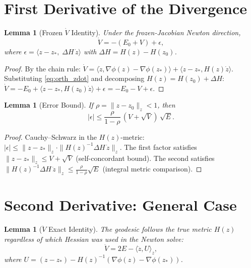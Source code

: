\documentclass[11pt]{article}
\newtheorem{lemma}[theorem]{Lemma}
\begin{document}
\section{First Derivative of the Divergence}

\begin{lemma}[Frozen $\dot{V}$ Identity]
\label{lem:vdot_frozen}
Under the frozen-Jacobian Newton direction,
\begin{equation} \label{eq:vdot_frozen}
    \dot{V} = -(E_0 + V) + \epsilon,
\end{equation}
where $\epsilon = \langle z - z_*,\; \Delta H\, \dot{z} \rangle$
with $\Delta H = H(z) - H(z_0)$.
\end{lemma}

\begin{proof}
By the chain rule:
$\dot{V} = \langle \dot{z}, \nabla\phi(z) - \nabla\phi(z_*) \rangle
         + \langle z - z_*, H(z)\dot{z} \rangle$.
Substituting \eqref{eq:orth_zdot} and decomposing $H(z) = H(z_0) + \Delta H$:
$\dot{V} = -E_0 + \langle z-z_*, H(z_0)\dot{z}\rangle + \epsilon
         = -E_0 - V + \epsilon$.
\end{proof}

\begin{lemma}[Error Bound]
\label{lem:epsilon_bound}
If $\rho = \|z - z_0\|_z < 1$, then
\begin{equation}
    |\epsilon| \le \frac{\rho}{1-\rho}\,(V + \sqrt{V})\,\sqrt{E}.
\end{equation}
\end{lemma}

\begin{proof}
Cauchy--Schwarz in the $H(z)$-metric:
$|\epsilon| \le \|z-z_*\|_z \cdot \|H(z)^{-1}\Delta H\,\dot{z}\|_z$.
The first factor satisfies $\|z-z_*\|_z \le V + \sqrt{V}$
(self-concordant bound).  The second satisfies
$\|H(z)^{-1}\Delta H\,\dot{z}\|_z \le \frac{\rho}{1-\rho}\sqrt{E}$
(integral metric comparison).
\end{proof}

\section{Second Derivative: General Case}

\begin{lemma}[$\ddot{V}$ Exact Identity]
\label{lem:vddot}
The geodesic follows the true metric $H(z)$ regardless of which
Hessian was used in the Newton solve:
\begin{equation} \label{eq:vddot_exact}
    \ddot{V} = 2E - \langle \ddot{z}, U \rangle_z,
\end{equation}
where $U = (z - z_*) - H(z)^{-1}(\nabla\phi(z) - \nabla\phi(z_*))$.
\end{lemma}
\end{document}
